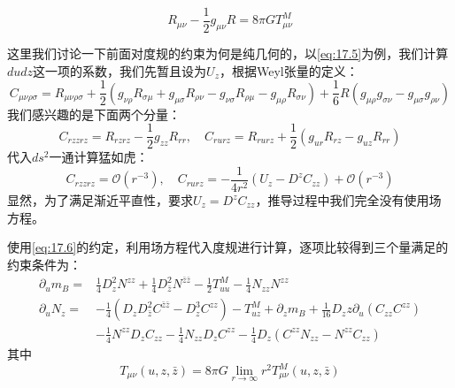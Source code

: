 \begin{equation}
	R_{\mu\nu}-\frac{1}{2}g_{\mu\nu}R=8\pi G T^M_{\mu\nu}
\end{equation}
\begin{remark}
	这里我们讨论一下前面对度规的约束为何是纯几何的，以\ref{eq:17.5}为例，我们计算$dudz$这一项的系数，我们先暂且设为$U_z$，根据Weyl张量的定义：
	\begin{equation}
		C_{\mu\nu\rho\sigma}=R_{\mu\nu\rho\sigma}+\frac{1}{2}\left(g_{\nu\rho}R_{\sigma\mu}+g_{\mu\sigma}R_{\rho\nu}-g_{\nu\sigma}R_{\rho\mu}-g_{\mu\rho}R_{\sigma\nu}\right)+\frac{1}{6}R\left(g_{\mu\rho}g_{\sigma\nu}-g_{\mu\sigma}g_{\rho\nu}\right)
	\end{equation}
	我们感兴趣的是下面两个分量：
	\begin{equation}
		C_{rzzrz}=R_{rzrz}-\frac{1}{2}g_{zz}R_{rr},\quad C_{rurz}=R_{rurz}+\frac{1}{2}(g_{ur}R_{rz}-g_{uz}R_{rr})
	\end{equation}
	代入$ds^2$一通计算猛如虎：
	\begin{equation}
		C_{rzzrz}=\mathcal{O}(r^{-3}),\quad C_{rurz}=-\frac{1}{4r^2}\left(U_z-D^z C_{zz}\right)+\mathcal{O}(r^{-3})
	\end{equation}
	显然，为了满足渐近平直性，要求$U_z=D^zC_{zz}$，推导过程中我们完全没有使用场方程。
\end{remark}
使用\ref{eq:17.6}的约定，利用场方程代入度规进行计算，逐项比较得到三个量满足的约束条件为：
\begin{equation}
	\begin{aligned}
		\partial_u m_B=&\frac{1}{4}D_z^2N^{zz}+\frac{1}{4}D_{\bar z}^2N^{\bar z\bar z}-\frac{1}{2}T^M_{uu}-\frac{1}{4}N_{zz}N^{zz}\\
		\partial_u N_z=&-\frac{1}{4}\left(D_zD_{\bar z}^2C^{\bar z\bar z}-D^3_zC^{zz}\right)-T^{M}_{uz}+\partial_z m_B+\frac{1}{16}D_zz\partial_u(C_{zz}C^{zz})\\
		&-\frac{1}{4}N^{zz}D_zC_{zz}-\frac{1}{4}N_{zz}D_zC^{zz}-\frac{1}{4}D_z\left(C^{zz}N_{zz}-N^{zz}C_{zz}\right)
	\end{aligned}
\end{equation}
其中
\begin{equation}
	T_{\mu\nu}(u,z,\bar z)=8\pi G\lim_{r\to\infty}r^2 T^M_{\mu\nu}(u,z,\bar z)
\end{equation}

